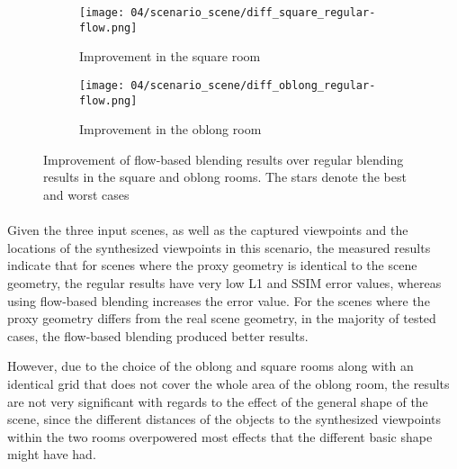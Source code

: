 \begin{figure}
\centering
    \hfill
    \begin{subfigure}[b]{0.45\textwidth}
            \centering
            \texttt{[image: 04/scenario\_scene/diff\_square\_regular-flow.png]}
            \caption{Improvement in the square room}
    \end{subfigure}
    \hfill
    \begin{subfigure}[b]{0.45\textwidth}
            \centering
            \texttt{[image: 04/scenario\_scene/diff\_oblong\_regular-flow.png]}
            \caption{Improvement in the oblong room}
    \end{subfigure}
    \hfill
  \caption[Improvement of flow-based blending results over regular blending results in the square and oblong rooms]{Improvement of flow-based blending results over regular blending results in the square and oblong rooms. The stars denote the best and worst cases} \label{fig:scene_diff_square_oblong}
\end{figure}


\paragraph{}

Given the three input scenes, as well as the captured viewpoints and the locations of the synthesized viewpoints in this scenario, the measured results indicate that for scenes where the proxy geometry is identical to the scene geometry, the regular results have very low L1 and SSIM error values, whereas using flow-based blending increases the error value. For the scenes where the proxy geometry differs from the real scene geometry, in the majority of tested cases, the flow-based blending produced better results.

However, due to the choice of the oblong and square rooms along with an identical grid that does not cover the whole area of the oblong room, the results are not very significant with regards to the effect of the general shape of the scene, since the different distances of the objects to the synthesized viewpoints within the two rooms overpowered most effects that the different basic shape might have had.

